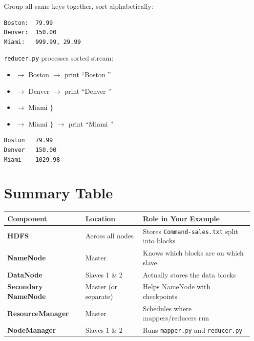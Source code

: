\documentclass[12pt,a4paper]{article}
\begin{document}
\begin{tcolorbox}[colback=purple!10, colframe=purple!80!black, title=\textbf{STEP 5: SHUFFLE \& SORT (Hadoop magic!)}]
Group all same keys together, sort alphabetically:
\begin{verbatim}
Boston:  79.99
Denver:  150.00
Miami:   999.99, 29.99
\end{verbatim}
\end{tcolorbox}

\begin{tcolorbox}[colback=red!10, colframe=red!80!black, title=\textbf{STEP 6: Reducer runs (on one or more nodes)}]
\texttt{reducer.py} processes sorted stream:
\begin{itemize}[noitemsep]
    \item $\rightarrow$ Boston  \quad $\rightarrow$ print ``Boston ''
    \item $\rightarrow$ Denver  \quad $\rightarrow$ print ``Denver ''
    \item $\rightarrow$ Miami  $\}$
    \item $\rightarrow$ Miami  \quad $\}$ $\rightarrow$ print ``Miami ''
\end{itemize}
\end{tcolorbox}

\begin{tcolorbox}[colback=green!10, colframe=green!60!black, title=\textbf{STEP 7: Output written to HDFS: /result/part-00000}]
\begin{verbatim}
Boston   79.99
Denver   150.00
Miami    1029.98
\end{verbatim}
\end{tcolorbox}

\section{Summary Table}

\begin{table}[h]
\centering
\renewcommand{\arraystretch}{1.5}
\begin{tabular}{>{\bfseries}l l p{7cm}}
\toprule
Component & Location & Role in Your Example \\
\midrule
HDFS & Across all nodes & Stores \texttt{Command-sales.txt} split into blocks \\
NameNode & Master & Knows which blocks are on which slave \\
DataNode & Slaves 1 \& 2 & Actually stores the data blocks \\
Secondary NameNode & Master (or separate) & Helps NameNode with checkpoints \\
ResourceManager & Master & Schedules where mappers/reducers run \\
NodeManager & Slaves 1 \& 2 & Runs \texttt{mapper.py} and \texttt{reducer.py} \\
\bottomrule
\end{tabular}
\end{table}
\end{document}
